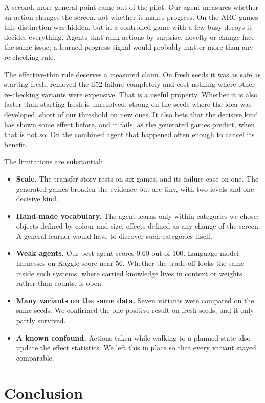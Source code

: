 \documentclass[11pt,a4paper]{article}
\begin{document}
A second, more general point came out of the pilot. Our agent measures whether an action changes the screen, not whether it makes progress. On the ARC games this distinction was hidden, but in a controlled game with a few busy decoys it decides everything. Agents that rank actions by surprise, novelty or change face the same issue; a learned progress signal would probably matter more than any re-checking rule.

The effective-thin rule deserves a measured claim. On fresh seeds it was as safe as starting fresh, removed the lf52 failure completely and cost nothing where other re-checking variants were expensive. That is a useful property. Whether it is also faster than starting fresh is unresolved: strong on the seeds where the idea was developed, short of our threshold on new ones. It also bets that the decisive kind has shown some effect before, and it fails, as the generated games predict, when that is not so. On the combined agent that happened often enough to cancel its benefit.

The limitations are substantial:
\begin{itemize}
  \item \textbf{Scale.} The transfer story rests on six games, and its failure case on one. The generated games broaden the evidence but are tiny, with two levels and one decisive kind.
  \item \textbf{Hand-made vocabulary.} The agent learns only within categories we chose: objects defined by colour and size, effects defined as any change of the screen. A general learner would have to discover such categories itself.
  \item \textbf{Weak agents.} Our best agent scores 0.60 out of 100. Language-model harnesses on Kaggle score near 56. Whether the trade-off looks the same inside such systems, where carried knowledge lives in context or weights rather than counts, is open.
  \item \textbf{Many variants on the same data.} Seven variants were compared on the same seeds. We confirmed the one positive result on fresh seeds, and it only partly survived.
  \item \textbf{A known confound.} Actions taken while walking to a planned state also update the effect statistics. We left this in place so that every variant stayed comparable.
\end{itemize}

\section{Conclusion}
\end{document}
